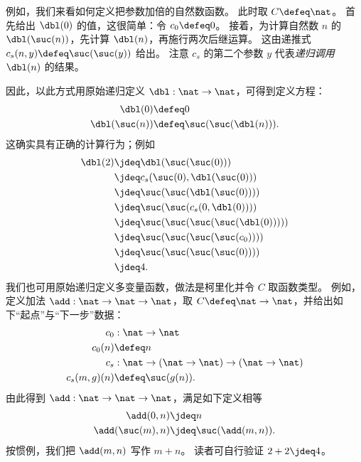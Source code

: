 例如，我们来看如何定义把参数加倍的自然数函数。
此时取 $C\defeq \nat$。
首先给出 $\dbl(0)$ 的值，这很简单：令 $c_0 \defeq 0$。
接着，为计算自然数 $n$ 的 $\dbl(\suc(n))$，先计算 $\dbl(n)$，再施行两次后继运算。
这由递推式 $c_s(n,y) \defeq \suc(\suc(y))$ 给出。
注意 $c_s$ 的第二个参数 $y$ 代表\emph{递归调用} $\dbl(n)$ 的结果。

因此，以此方式用原始递归定义 $\dbl:\nat\to\nat$，可得到定义方程：
\begin{align*}
  \dbl(0) &\defeq 0\\
  \dbl(\suc(n)) &\defeq \suc(\suc(\dbl(n))).
\end{align*}
这确实具有正确的计算行为；例如
\begin{align*}
  \dbl(2) &\jdeq \dbl(\suc(\suc(0)))\\
  & \jdeq c_s(\suc(0), \dbl(\suc(0))) \\
                 & \jdeq \suc(\suc(\dbl(\suc(0)))) \\
                 & \jdeq \suc(\suc(c_s(0,\dbl(0)))) \\
                 & \jdeq \suc(\suc(\suc(\suc(\dbl(0))))) \\
                 & \jdeq \suc(\suc(\suc(\suc(c_0)))) \\
                 & \jdeq \suc(\suc(\suc(\suc(0))))\\
                 &\jdeq 4.
\end{align*}
我们也可用原始递归定义多变量函数，做法是柯里化并令 $C$ 取函数类型。
例如，定义加法 $\add : \nat \to \nat \to \nat$，取 $C \defeq \nat \to \nat$，并给出如下“起点”与“下一步”数据：
\begin{align*}
  c_0 & : \nat \to \nat \\
  c_0 (n) & \defeq n \\
  c_s & : \nat \to (\nat \to \nat) \to (\nat \to \nat) \\
  c_s(m,g)(n) & \defeq \suc(g(n)).
\end{align*}
由此得到 $\add : \nat \to \nat \to \nat$，满足如下定义相等
\begin{align*}
  \add(0,n) &\jdeq n \\
  \add(\suc(m),n) &\jdeq \suc(\add(m,n)). 
\end{align*}
按惯例，我们把 $\add(m,n)$ 写作 $m+n$。
读者可自行验证 $2+2\jdeq 4$。

